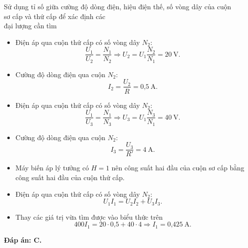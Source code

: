 \begin{dang}{Sử dụng tỉ số giữa cường độ dòng điện, hiệu điện thế, số vòng dây của cuộn\\ sơ cấp và thứ cấp để xác định các\\ đại lượng cần tìm}
{		\begin{itemize}
			\item Điện áp qua cuộn thứ cấp có số vòng dây $N_2$:
			\begin{equation*}
				\dfrac{U_1}{U_2}=\dfrac{N_1}{N_2} \Rightarrow U_2 = U_1 \dfrac{N_2}{N_1} =20\ \text{V}.
			\end{equation*}
			\item Cường độ dòng điện qua cuộn $N_2$:
			\begin{equation*}
				I_2=\dfrac{U_2}{R}=\text{0,5}\ \text{A}.
			\end{equation*}
			\item Điện áp qua cuộn thứ cấp có số vòng dây $N_2$:
			\begin{equation*}
				\dfrac{U_1}{U_3}=\dfrac{N_1}{N_3} \Rightarrow U_3 = U_1 \dfrac{N_3}{N_1} =40\ \text{V}.
			\end{equation*}
			\item Cường độ dòng điện qua cuộn $N_2$:
			\begin{equation*}
				I_3=\dfrac{U_3}{R'}=4\ \text{A}.
			\end{equation*}
			\item Máy biến áp lý tưởng có $H=1$ nên công suất hai đầu của cuộn sơ cấp bằng công suất hai đầu của cuộn thứ cấp.
			\item Điện áp qua cuộn thứ cấp có số vòng dây $N_2$:
			\begin{equation*}
				U_1I_1=U_2I_2+U_3I_3.
			\end{equation*}
			\item Thay các giá trị vừa tìm được vào biểu thức trên 
			\begin{equation*}
				400I_1= 20 \cdot \text{0,5}+40 \cdot 4 \Rightarrow I_1 =\text{0,425}\ \text{A}.
			\end{equation*}
		\end{itemize}
		\textbf{Đáp án: C.}
	}
\end{dang}

